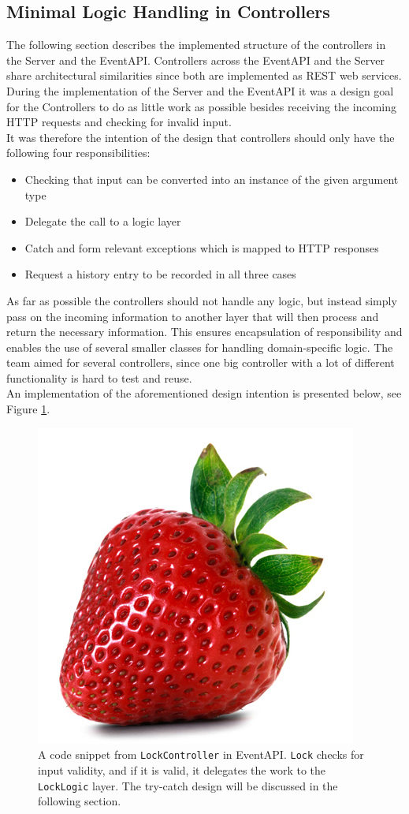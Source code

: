 \subsection{Minimal Logic Handling in Controllers}
The following section describes the implemented structure of the controllers in the Server and the EventAPI. Controllers across the EventAPI and the Server share architectural similarities since both are implemented as REST web services. \\

During the implementation of the Server and the EventAPI it was a design goal for the Controllers to do as little work as possible besides receiving the incoming HTTP requests and checking for invalid input. \\ 

It was therefore the intention of the design that controllers should only have the following four responsibilities:
\begin{itemize}
\item Checking that input can be converted into an instance of the given argument type
\item Delegate the call to a logic layer
\item Catch and form relevant exceptions which is mapped to HTTP responses
\item Request a history entry to be recorded in all three cases
\end{itemize}

As far as possible the controllers should not handle any logic, but instead simply pass on the incoming information to another layer that will then process and return the necessary information. This ensures encapsulation of responsibility and enables the use of several smaller classes for handling domain-specific logic. The team aimed for several controllers, since one big controller with a lot of different functionality is hard to test and reuse.\\

An implementation of the aforementioned design intention is presented below, see Figure \ref{fig:LockController}.

\begin{figure}[h!]
\centering
\includegraphics[width=0.3\linewidth]{figures/strawberry}
\caption{\label{fig:LockController}A code snippet from \texttt{LockController} in EventAPI. \texttt{Lock} checks for input validity, and if it is valid, it delegates the work to the \texttt{LockLogic} layer. The try-catch design will be discussed in the following section. }
\end{figure}


